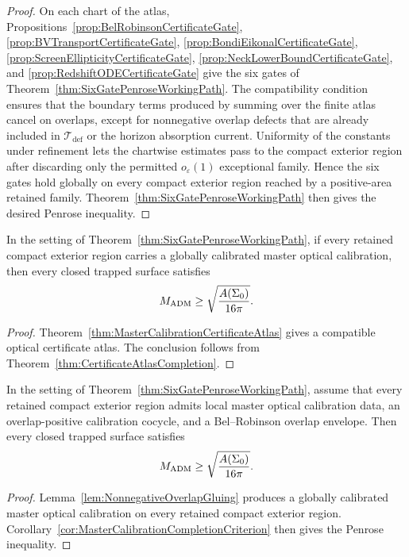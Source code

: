 \begin{proof}
On each chart of the atlas, Propositions~\ref{prop:BelRobinsonCertificateGate}, \ref{prop:BVTransportCertificateGate}, \ref{prop:BondiEikonalCertificateGate}, \ref{prop:ScreenEllipticityCertificateGate}, \ref{prop:NeckLowerBoundCertificateGate}, and \ref{prop:RedshiftODECertificateGate} give the six gates of Theorem~\ref{thm:SixGatePenroseWorkingPath}. The compatibility condition ensures that the boundary terms produced by summing over the finite atlas cancel on overlaps, except for nonnegative overlap defects that are already included in $\mathcal T_{\mathrm{def}}$ or the horizon absorption current. Uniformity of the constants under refinement lets the chartwise estimates pass to the compact exterior region after discarding only the permitted $o_\varepsilon(1)$ exceptional family. Hence the six gates hold globally on every compact exterior region reached by a positive-area retained family. Theorem~\ref{thm:SixGatePenroseWorkingPath} then gives the desired Penrose inequality.
\end{proof}

\begin{corollary}\label{cor:MasterCalibrationCompletionCriterion}
In the setting of Theorem~\ref{thm:SixGatePenroseWorkingPath}, if every retained compact exterior region carries a globally calibrated master optical calibration, then every closed trapped surface satisfies
\[
    M_{\mathrm{ADM}}\ge \sqrt{\frac{A(\Sigma_0)}{16\pi}} .
\]
\end{corollary}

\begin{proof}
Theorem~\ref{thm:MasterCalibrationCertificateAtlas} gives a compatible optical certificate atlas. The conclusion follows from Theorem~\ref{thm:CertificateAtlasCompletion}.
\end{proof}

\begin{corollary}\label{cor:LocalCalibrationGluingPenrose}
In the setting of Theorem~\ref{thm:SixGatePenroseWorkingPath}, assume that every retained compact exterior region admits local master optical calibration data, an overlap-positive calibration cocycle, and a Bel--Robinson overlap envelope. Then every closed trapped surface satisfies
\[
    M_{\mathrm{ADM}}\ge \sqrt{\frac{A(\Sigma_0)}{16\pi}} .
\]
\end{corollary}

\begin{proof}
Lemma~\ref{lem:NonnegativeOverlapGluing} produces a globally calibrated master optical calibration on every retained compact exterior region. Corollary~\ref{cor:MasterCalibrationCompletionCriterion} then gives the Penrose inequality.
\end{proof}

